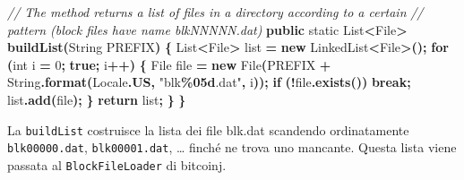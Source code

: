 \documentclass[
  italian,
  openany]{book}
\newenvironment{Shaded}{\begin{snugshade}}{\end{snugshade}}
\newcommand{\BuiltInTok}[1]{#1}
\newcommand{\CommentTok}[1]{\textcolor[rgb]{0.56,0.35,0.01}{\textit{#1}}}
\newcommand{\ControlFlowTok}[1]{\textcolor[rgb]{0.13,0.29,0.53}{\textbf{#1}}}
\newcommand{\DataTypeTok}[1]{\textcolor[rgb]{0.13,0.29,0.53}{#1}}
\newcommand{\DecValTok}[1]{\textcolor[rgb]{0.00,0.00,0.81}{#1}}
\newcommand{\FunctionTok}[1]{\textcolor[rgb]{0.13,0.29,0.53}{\textbf{#1}}}
\newcommand{\KeywordTok}[1]{\textcolor[rgb]{0.13,0.29,0.53}{\textbf{#1}}}
\newcommand{\NormalTok}[1]{#1}
\newcommand{\OperatorTok}[1]{\textcolor[rgb]{0.81,0.36,0.00}{\textbf{#1}}}
\newcommand{\SpecialCharTok}[1]{\textcolor[rgb]{0.81,0.36,0.00}{\textbf{#1}}}
\newcommand{\StringTok}[1]{\textcolor[rgb]{0.31,0.60,0.02}{#1}}
\begin{document}
\begin{Shaded}
\begin{Highlighting}[]
    \CommentTok{// The method returns a list of files in a directory according to a certain}
    \CommentTok{// pattern (block files have name blkNNNNN.dat)}
    \KeywordTok{public} \DataTypeTok{static} \BuiltInTok{List}\OperatorTok{\textless{}}\BuiltInTok{File}\OperatorTok{\textgreater{}} \FunctionTok{buildList}\OperatorTok{(}\BuiltInTok{String}\NormalTok{ PREFIX}\OperatorTok{)} \OperatorTok{\{}
        \BuiltInTok{List}\OperatorTok{\textless{}}\BuiltInTok{File}\OperatorTok{\textgreater{}}\NormalTok{ list }\OperatorTok{=} \KeywordTok{new} \BuiltInTok{LinkedList}\OperatorTok{\textless{}}\BuiltInTok{File}\OperatorTok{\textgreater{}();}
        \ControlFlowTok{for} \OperatorTok{(}\DataTypeTok{int}\NormalTok{ i }\OperatorTok{=} \DecValTok{0}\OperatorTok{;} \KeywordTok{true}\OperatorTok{;}\NormalTok{ i}\OperatorTok{++)} \OperatorTok{\{}
            \BuiltInTok{File}\NormalTok{ file }\OperatorTok{=} \KeywordTok{new} \BuiltInTok{File}\OperatorTok{(}\NormalTok{PREFIX }\OperatorTok{+} \BuiltInTok{String}\OperatorTok{.}\FunctionTok{format}\OperatorTok{(}\BuiltInTok{Locale}\OperatorTok{.}\FunctionTok{US}\OperatorTok{,} \StringTok{"blk}\SpecialCharTok{\%05d}\StringTok{.dat"}\OperatorTok{,}\NormalTok{ i}\OperatorTok{));}
            \ControlFlowTok{if} \OperatorTok{(!}\NormalTok{file}\OperatorTok{.}\FunctionTok{exists}\OperatorTok{())} \ControlFlowTok{break}\OperatorTok{;}
\NormalTok{            list}\OperatorTok{.}\FunctionTok{add}\OperatorTok{(}\NormalTok{file}\OperatorTok{);}
        \OperatorTok{\}}
        \ControlFlowTok{return}\NormalTok{ list}\OperatorTok{;}
    \OperatorTok{\}}
\OperatorTok{\}}
\end{Highlighting}
\end{Shaded}

La \texttt{buildList} costruisce la lista dei file blk.dat scandendo
ordinatamente \texttt{blk00000.dat}, \texttt{blk00001.dat}, \ldots{}
finché ne trova uno mancante. Questa lista viene passata al
\texttt{BlockFileLoader} di bitcoinj.
\end{document}
